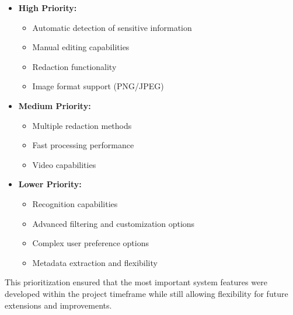 \begin{itemize}
    \item \textbf{High Priority:}
    \begin{itemize}
        \item Automatic detection of sensitive information
        \item Manual editing capabilities
        \item Redaction functionality
        \item Image format support (PNG/JPEG)
    \end{itemize}

    \item \textbf{Medium Priority:}
    \begin{itemize}
        \item Multiple redaction methods
        \item Fast processing performance
        \item Video capabilities
    \end{itemize} 

    \item \textbf{Lower Priority:}
    \begin{itemize}
        \item Recognition capabilities
        \item Advanced filtering and customization options
        \item Complex user preference options
        \item Metadata extraction and flexibility
    \end{itemize}
\end{itemize}

This prioritization ensured that the most important system features were developed within the project timeframe while still allowing flexibility for future extensions and improvements.